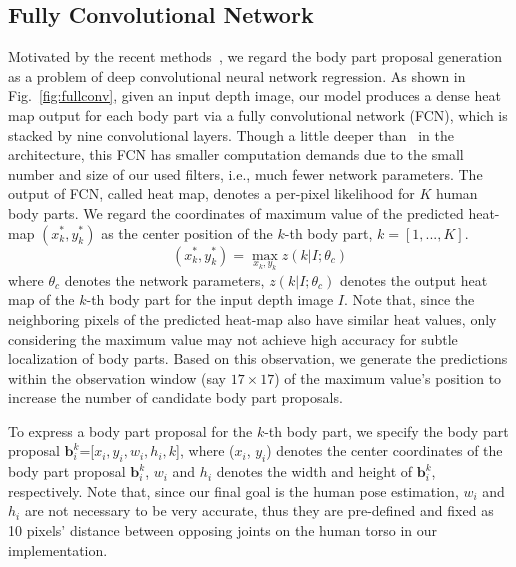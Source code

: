 \documentclass{sig-alternate-05-2015}
\begin{document}
\subsection{Fully Convolutional Network}
Motivated by the recent methods~\cite{jt14nips, dp14cvpr}, we regard the body part proposal generation as a problem of deep convolutional neural network regression. As shown in Fig.~\ref{fig:fullconv}, given an input depth image, our model produces a dense heat map output for each body part via a fully convolutional network (FCN), which is stacked by nine convolutional layers. Though a little deeper than~\cite{dp14cvpr} in the architecture, this FCN has smaller computation demands due to the small number and size of our used filters, i.e., much fewer network parameters. The output of FCN, called heat map, denotes a per-pixel likelihood for $K$ human body parts. We regard the coordinates of maximum value of the predicted heat-map $(x_k^*, y_k^*)$ as the center position of the $k$-th body part, $k=[1, ...,K]$.
\begin{equation}
(x_k^*, y_k^*) = \max_{x_k, y_k} z(k|I;\theta_c)
\end{equation}
where $\theta_c$ denotes the network parameters, $z(k|I;\theta_c)$ denotes the output heat map of the $k$-th body part for the input depth image $I$. Note that, since the neighboring pixels of the predicted heat-map also have similar heat values, only considering the maximum value may not achieve high accuracy for subtle localization of body parts. Based on this observation, we generate the predictions within the observation window (say $17\times17$) of the maximum value's position to increase the number of candidate body part proposals.

To express a body part proposal for the $k$-th body part, we specify the body part proposal $\textbf{b}_i^k$=[$x_i, y_i, w_i, h_i, k$], where ($x_i$, $y_i$) denotes the center coordinates of the body part proposal $\textbf{b}_i^k$, $w_i$ and $h_i$ denotes the width and height of $\textbf{b}_i^k$, respectively. Note that, since our final goal is the human pose estimation, $w_i$ and $h_i$ are not necessary to be very accurate, thus they are pre-defined and fixed as 10 pixels' distance between opposing joints on the human torso in our implementation. 
\end{document}

